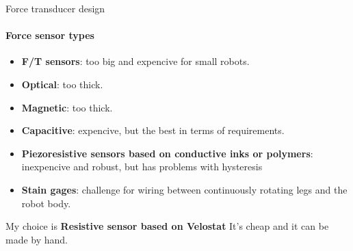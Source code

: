 \documentclass[aspectratio=169]{beamer}
\begin{document}
\begin{frame}[t]{Force transducer design}
    \framesubtitle{Force sensor types}
    \vspace{-20pt}
    \begin{multicols}{2}
        \begin{itemize}
            \item \textbf{F/T sensors}: too big and expencive for small robots.
            \item \textbf{Optical}: too thick.
            \item \textbf{Magnetic}: too thick.
            \item \textbf{Capacitive}: expencive, but the best in terms of requirements.
            \item \textbf{Piezoresistive sensors
                      based on conductive inks or polymers}: inexpencive and robust, but has problems with hysteresis
            \item \textbf{Stain gages}: challenge for wiring between continuously rotating legs and the robot body.
        \end{itemize}
    \end{multicols}
    \vspace{-10pt}
    \begin{exampleblock}{My choice is \textbf{Resistive sensor based on Velostat}}
        It's cheap and it can be made by hand.
    \end{exampleblock}
\end{frame}
\end{document}
